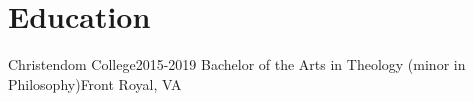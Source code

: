 \section{Education}
    \resumeSubHeadingListStart

    \resumeSubheading
    {Christendom College}{2015-2019}
    {Bachelor of the Arts in Theology (minor in Philosophy)}{Front Royal, VA}

    \resumeSubHeadingListEnd